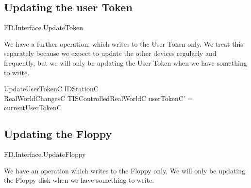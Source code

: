 \subsection{Updating the user Token}

\begin{traceunit}{FD.Interface.UpdateToken}
\end{traceunit}

We have a further operation, which writes to the User Token only.
We treat this separately because we expect to update the other devices
regularly and frequently,
but we will only be updating the User Token when we have something to
write. 

\begin{schema}{UpdateUserTokenC}
	\Delta IDStationC
\\	RealWorldChangesC
\also
        \Xi TISControlledRealWorldC
\where
	userTokenC' = currentUserTokenC
\end{schema}

\subsection{Updating the Floppy}

\begin{traceunit}{FD.Interface.UpdateFloppy}
\end{traceunit}


We have an operation which writes to the Floppy only.
We will only be updating the Floppy disk when we have something to write.

